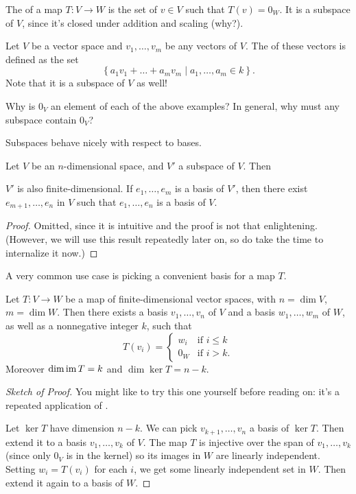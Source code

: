 \begin{example}[Kernels]
	The  of a map $T \colon V \to W$ is the
	set of $v \in V$ such that $T(v) = 0_W$.
	It is a subspace of $V$, since it's closed under addition and scaling (why?).
\end{example}
\begin{example}[Spans]
	Let $V$ be a vector space and $v_1, \dots, v_m$ be any vectors of $V$.
	The  of these vectors is defined as the set
	\[ \left\{ a_1 v_1 + \dots + a_m v_m \mid a_1, \dots, a_m \in k \right\}. \]
	Note that it is a subspace of $V$ as well!
\end{example}
\begin{ques}
	Why is $0_V$ an element of each of the above examples?
	In general, why must any subspace contain $0_V$?
\end{ques}

Subspaces behave nicely with respect to bases.
\begin{theorem}
	\label{thm:basis_completion}
	Let $V$ be an $n$-dimensional space, and $V'$ a subspace of $V$.
	Then
	\begin{enumerate}[(a)]
		\ii $V'$ is also finite-dimensional.
		\ii If $e_1, \dots, e_m$ is a basis of $V'$, then there exist
		$e_{m+1}, \dots, e_n$ in $V$ such that
		$e_1, \dots, e_n$ is a basis of $V$.
	\end{enumerate}
\end{theorem}
\begin{proof}
	Omitted, since it is intuitive and the proof is not that enlightening.
	(However, we will use this result repeatedly later on,
	so do take the time to internalize it now.)
\end{proof}

A very common use case is picking a convenient basis for a map $T$.
\begin{theorem}
	\label{thm:linear_map_basis}
	Let $T \colon V \to W$ be a map of finite-dimensional vector spaces,
	with $n = \dim V$, $m = \dim W$.
	Then there exists a basis $v_1, \dots, v_n$ of $V$
	and a basis $w_1, \dots, w_m$ of $W$,
	as well as a nonnegative integer $k$, such that
	\[
		T(v_i) =
		\begin{cases}
			w_i & \text{if $i \le k$} \\
			0_W & \text{if $i > k$}.
		\end{cases}
	\]
	Moreover $\dim \operatorname{im} T = k$ and $\dim \ker T = n-k$.
\end{theorem}
\begin{proof}[Sketch of Proof]
	You might like to try this one yourself before reading on:
	it's a repeated application of .

	Let $\ker T$ have dimension $n-k$.
	We can pick $v_{k+1}, \dots, v_{n}$ a basis of $\ker T$.
	Then extend it to a basis $v_1, \dots, v_k$ of $V$.
	The map $T$ is injective over the span of $v_1, \dots, v_k$
	(since only $0_V$ is in the kernel) so its images in $W$ are linearly independent.
	Setting $w_i = T(v_i)$ for each $i$,
	we get some linearly independent set in $W$.
	Then extend it again to a basis of $W$.
\end{proof}

